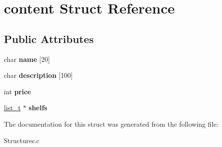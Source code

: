\hypertarget{structcontent}{}\section{content Struct Reference}
\label{structcontent}
\subsection*{Public Attributes}
\begin{DoxyCompactItemize}
\item 
\hypertarget{structcontent_a9c2984895e03d808b3882c2dd1bebe41}{}char {\bfseries name} \mbox{[}20\mbox{]}\label{structcontent_a9c2984895e03d808b3882c2dd1bebe41}

\item 
\hypertarget{structcontent_af02ebd9bb78b1d8aa320cda1fdf06634}{}char {\bfseries description} \mbox{[}100\mbox{]}\label{structcontent_af02ebd9bb78b1d8aa320cda1fdf06634}

\item 
\hypertarget{structcontent_a9f2b8eb0b3e50ead4cd6028dd93290fb}{}int {\bfseries price}\label{structcontent_a9f2b8eb0b3e50ead4cd6028dd93290fb}

\item 
\hypertarget{structcontent_a26c862e9716305f67cbed63d3fee04c4}{}\hyperlink{structlist}{list\+\_\+t} $\ast$ {\bfseries shelfs}\label{structcontent_a26c862e9716305f67cbed63d3fee04c4}

\end{DoxyCompactItemize}


The documentation for this struct was generated from the following file\+:\begin{DoxyCompactItemize}
\item 
Structures.\+c\end{DoxyCompactItemize}
